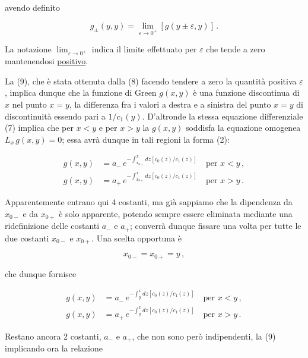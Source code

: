 \documentclass[11pt, a4paper]{book}
\numberwithin{equation}{section}
\begin{document}
avendo definito

\begin{equation}
    g_\pm(y,y) = \lim_{\varepsilon \to 0^+} \left[ g(y \pm \varepsilon, y) \right] \,.
\end{equation}

La notazione $\lim_{\varepsilon\to 0^+}$ indica il limite effettuato per $\varepsilon$ che tende a zero mantenendosi \uline{positivo}.

La (9), che è stata ottenuta dalla (8) facendo tendere a zero la quantità positiva $\varepsilon$, implica dunque che la funzione di Green $g(x,y)$ è una funzione discontinua di $x$ nel punto $x=y$, la differenza fra i valori a destra e a sinistra del punto $x=y$ di discontinuità essendo pari a $1/c_1(y)$. D'altronde la stessa equazione differenziale (7) implica che per $x < y$ e per $x > y$ la $g(x,y)$ soddisfa la equazione omogenea $L_x \, g(x,y) = 0$; essa avrà dunque in tali regioni la forma (2):

\begin{align}
    g(x,y) &= a_- \, e^{\displaystyle -\int_{x_{0-}}^{x} dz \left[ c_0(z)/c_1(z) \right]} \quad \text{per } x < y \,, \tag{11a} \\
    g(x,y) &= a_+ \, e^{\displaystyle -\int_{x_{0+}}^{x} dz \left[ c_0(z)/c_1(z) \right]} \quad \text{per } x > y \,. \tag{11b}
\end{align}

Apparentemente entrano qui 4 costanti, ma già sappiamo che la dipendenza da $x_{0-}$ e da $x_{0+}$ è solo apparente, potendo sempre essere eliminata mediante una ridefinizione delle costanti $a_-$ e $a_+$; converrà dunque fissare una volta per tutte le due costanti $x_{0-}$ e $x_{0+}$. Una scelta opportuna è

\begin{equation}
    x_{0-} = x_{0+} = y \,,
\end{equation}

che dunque fornisce

\begin{align}
    g(x,y) &= a_- \, e^{\displaystyle -\int_{y}^{x} dz \left[ c_0(z)/c_1(z) \right]} \quad \text{per } x < y \,, \tag{13a} \\
    g(x,y) &= a_+ \, e^{\displaystyle -\int_{y}^{x} dz \left[ c_0(z)/c_1(z) \right]} \quad \text{per } x > y \,. \tag{13b}
\end{align}

Restano ancora 2 costanti, $a_-$ e $a_+$, che non sono però indipendenti, la (9) implicando ora la relazione
\end{document}
